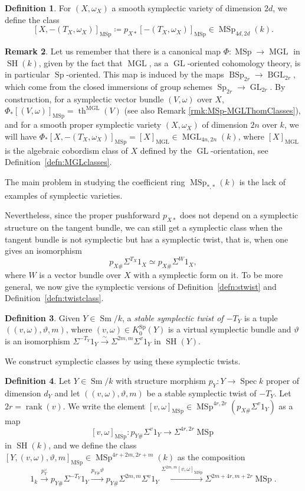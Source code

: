 \documentclass[10pt]{amsart}
\theoremstyle{definition}
\newtheorem{defn}{Definition}[section]
\newtheorem{rmk}[defn]{Remark}
\theoremstyle{plain}
\numberwithin{equation}{section}
\newcommand{\0}{\emptyset}
\newcommand{\MGL}{{\operatorname{MGL}}}
\newcommand{\MSp}{{\operatorname{MSp}}}
\newcommand{\BGL}{{\operatorname{BGL}}}
\newcommand{\BSp}{{\operatorname{BSp}}}
\newcommand{\GL}{{\operatorname{GL}}}
\newcommand{\Sp}{{\operatorname{Sp}}}
\newcommand{\Spec}{{\operatorname{Spec}}}
\newcommand{\SH}{{\operatorname{SH}}}
\newcommand{\Sm}{{\operatorname{Sm}}}
\renewcommand{\th}{{\operatorname{th}}}
\newcommand{\rnk}{{\operatorname{rank}}}
\begin{document}
\begin{defn}
\label{def:symplclass}
    For $(X,\omega_X)$ a smooth symplectic variety of dimension $2d$, we define the class
    \[
    [X,-(T_X,\omega_X)]_{\MSp} \coloneqq p_{X*}[-(T_{X},\omega_X)]_{\MSp} \in \MSp_{4d,2d}(k).
    \]
\end{defn}

\begin{rmk}
\label{rmk:Msp-MGL}
    Let us remember that there is a canonical map $\Phi:\MSp \to \MGL$ in $\SH(k)$, given by the fact that $\MGL$, as a $\GL$-oriented cohomology theory, is in particular $\Sp$-oriented. This map is induced by the maps $\BSp_{2r}\to \BGL_{2r}$, which come from the closed immersions of group schemes $\Sp_{2r}\to \GL_{2r}$. By construction, for a symplectic vector bundle $(V,\omega)$ over $X$, $\Phi_*[(V,\omega)]_{\MSp}=\th^{\MGL}(V)$ (see also Remark \ref{rmk:MSp-MGLThomClasses}), and for a smooth proper symplectic variety $(X,\omega_X)$ of dimension $2n$ over $k$, we will have $\Phi_*[X,-(T_X,\omega_X)]_{\MSp}=[X]_{\MGL} \in \MGL_{4n,2n}(k)$, where $[X]_{\MGL}$ is the algebraic cobordism class of $X$ defined by the $\GL$-orientation, see Definition~\ref{defn:MGLclasses}.
\end{rmk}

The main problem in studying the coefficient ring $\MSp_{*,*}(k)$ is the lack of examples of symplectic varieties.

Nevertheless, since the proper pushforward $p_{X*}$ does not depend on a symplectic structure on the tangent bundle, we can still get a symplectic class when the tangent bundle is not symplectic but has a symplectic twist, that is, when one gives an isomorphism
$$p_{X\#}\Sigma^{T_X}1_X \simeq p_{X\#}\Sigma^{W}1_X,$$
where $W$ is a vector bundle over $X$ with a symplectic form on it. To be more general, we now give the symplectic versions of Definition~\ref{defn:stwist} and Definition~\ref{defn:twistclass}.

\begin{defn}\label{defn:sstwist} Given $Y\in \Sm/k$, a {\em stable symplectic twist of $-T_Y$} is a tuple  $((v, \omega), \vartheta, m)$, where $(v, \omega)\in K_0^\Sp(Y)$ is a virtual symplectic bundle and  $\vartheta$  is an isomorphism $\Sigma^{-T_Y}1_Y\xrightarrow{\sim} \Sigma^{2m,m}\Sigma^{v}1_Y$ in $\SH(Y)$.  
\end{defn}

We construct symplectic classes by using these symplectic twists. 

\begin{defn}\label{defn:SymplecticTwistedClass} Let  $Y\in \Sm/k$ with structure morphism $p_Y:Y\to \Spec k$ proper of dimension $d_Y$  and let  $((v, \omega), \vartheta, m)$ be a stable symplectic twist of $-T_Y$. Let $2r=\rnk(v)$. We write the element $[v,\omega]_\MSp\in \MSp^{4r, 2r}(p_{X\#}\Sigma^v1_Y)$ as a map
\[
[v,\omega]_\MSp:p_{Y\#}\Sigma^v1_Y\to \Sigma^{4r,2r}\MSp
\]
in $\SH(k)$, and we define the class $[Y, (v, \omega), \vartheta, m]_\MSp\in \MSp^{4r+2m,2r+m}(k)$ as the composition
\[
1_k\xrightarrow{p_Y^\vee}p_{Y\#}\Sigma^{-T_Y}1_Y
\xrightarrow{p_{Y\#}\vartheta}
p_{Y\#}\Sigma^{2m,m}\Sigma^{v}1_Y\xrightarrow{\Sigma^{2m,m}[v,\omega]_\MSp}\Sigma^{2m+4r,m+2r}\MSp. 
\]
\end{defn}
\end{document}
